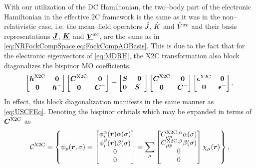 With our utilization of the DC Hamiltonian,
the two--body part of the electronic Hamiltonian in the effective 2C framework
is the same as it was in the non--relativistic case, i.e. the mean--field operators
$\hat{J}$, $\hat{K}$ and $\hat{V}^{xc}$ and their basis representations $\boldsymbol{\underline{J}}$, $\boldsymbol{\underline{K}}$ and $\boldsymbol{\underline{V}}^{xc}$, are the same as in 
\cref{eq:NRFockCompSpace,eq:FockCompAOBasis}. This is due to the fact that for the electronic
eigenvectors of \cref{eq:MDRH}, the X2C transformation also block diagonalizes the 
bispinor MO coefficients,
\begin{equation}
\begin{bmatrix} \boldsymbol{h}^{\mathrm{X2C}} & \boldsymbol{0} \\ \boldsymbol{0} & \boldsymbol{h}^- \end{bmatrix}
\begin{bmatrix} \boldsymbol{C}^{\mathrm{X2C}} & \boldsymbol{0} \\ \boldsymbol{0} & \boldsymbol{C}^- \end{bmatrix} =
\begin{bmatrix} \boldsymbol{S} & \boldsymbol{0} \\ \boldsymbol{0} & \boldsymbol{S}^- \end{bmatrix}
\begin{bmatrix} \boldsymbol{C}^{\mathrm{X2C}} & \boldsymbol{0} \\ \boldsymbol{0} & \boldsymbol{C}^- \end{bmatrix} 
\begin{bmatrix} \boldsymbol{\epsilon}^{\mathrm{X2C}} & \boldsymbol{0} \\ \boldsymbol{0} & \boldsymbol{\epsilon}^- \end{bmatrix}.
\end{equation}
In effect, this block diagonalization manifests in the same manner as \cref{eq:USCFEq}. 
Denoting the bispinor orbitals which may be expanded in terms of 
$\boldsymbol{C}^{\mathrm{X2C}}$ as
\begin{equation}
  \mathcal C^{\mathrm{X2C}} = \left\lbrace
  \psi_p(\boldsymbol{r}, \sigma) = 
  \begin{bmatrix} \phi^\alpha_i (\boldsymbol{r}) \alpha(\sigma) \\ \phi^\beta_i(\boldsymbol{r}) \beta(\sigma) \\ 0 \\ 0 \end{bmatrix} =
  \sum_\mu \begin{bmatrix} C_{\mu p}^{\mathrm{X2C},\alpha} \alpha(\sigma)\\ C_{\mu p}^{\mathrm{X2C},\beta}\beta(\sigma) \\ 0 \\ 0 \end{bmatrix} \chi_\mu(\boldsymbol{r}) \right\rbrace, 
\end{equation}
